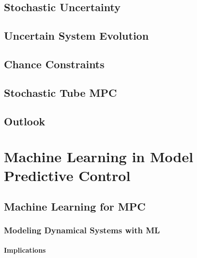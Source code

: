 
    \section{Stochastic Uncertainty} %

    \section{Uncertain System Evolution} %

    \section{Chance Constraints} %

    \section{Stochastic Tube MPC} %

    \section{Outlook} %

\chapter{Machine Learning in Model Predictive Control} %
	\label{c:ml}


    \section{Machine Learning for MPC} %

        \subsection{Modeling Dynamical Systems with ML} %

            \subsubsection{Implications} %

